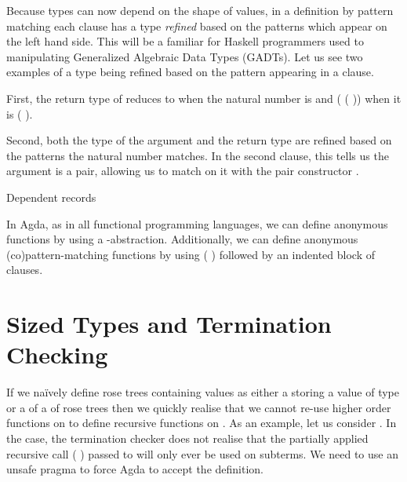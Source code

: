 Because types can now depend on the shape of values, in a definition by pattern
matching each clause has a type \emph{refined} based on the patterns which appear
on the left hand side. This will be a familiar for Haskell programmers used to
manipulating Generalized Algebraic Data Types (GADTs). Let us see two examples of
a type being refined based on the pattern appearing in a clause.

First, the return type of  reduces to  when the natural
number is  and (  (  )) when it is
( ).


Second, both the type of the  argument and the  return type
are refined based on the patterns the natural number matches. In the second clause,
this tells us the  argument is a pair, allowing us to match on it with
the pair constructor \AIC{\_,\_}.


Dependent records


In Agda, as in all functional programming languages, we can define anonymous functions
by using a -abstraction. Additionally, we can define anonymous (co)pattern-matching
functions by using ( ) followed by an indented block of clauses.


\section{Sized Types and Termination Checking}

If we naïvely define rose trees containing  values as either a  storing
a value of type  or a  of a  of rose trees then we quickly
realise that we cannot re-use higher order functions on  to define recursive
functions on . As an example, let us consider .
In the  case, the termination checker does not realise that the partially
applied recursive call ( ) passed to
 will only ever be used on subterms. We need to use
an unsafe  pragma to force Agda to accept the definition.

